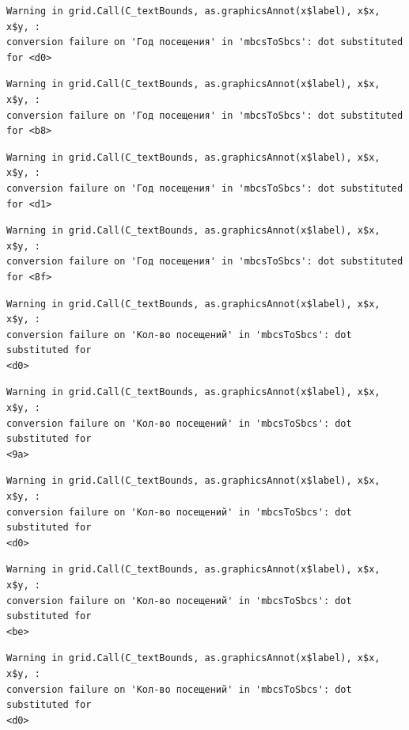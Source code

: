 \documentclass[
  letterpaper,
  DIV=11,
  numbers=noendperiod]{scrartcl}
\begin{document}
\begin{verbatim}
Warning in grid.Call(C_textBounds, as.graphicsAnnot(x$label), x$x, x$y, :
conversion failure on 'Год посещения' in 'mbcsToSbcs': dot substituted for <d0>
\end{verbatim}

\begin{verbatim}
Warning in grid.Call(C_textBounds, as.graphicsAnnot(x$label), x$x, x$y, :
conversion failure on 'Год посещения' in 'mbcsToSbcs': dot substituted for <b8>
\end{verbatim}

\begin{verbatim}
Warning in grid.Call(C_textBounds, as.graphicsAnnot(x$label), x$x, x$y, :
conversion failure on 'Год посещения' in 'mbcsToSbcs': dot substituted for <d1>
\end{verbatim}

\begin{verbatim}
Warning in grid.Call(C_textBounds, as.graphicsAnnot(x$label), x$x, x$y, :
conversion failure on 'Год посещения' in 'mbcsToSbcs': dot substituted for <8f>
\end{verbatim}

\begin{verbatim}
Warning in grid.Call(C_textBounds, as.graphicsAnnot(x$label), x$x, x$y, :
conversion failure on 'Кол-во посещений' in 'mbcsToSbcs': dot substituted for
<d0>
\end{verbatim}

\begin{verbatim}
Warning in grid.Call(C_textBounds, as.graphicsAnnot(x$label), x$x, x$y, :
conversion failure on 'Кол-во посещений' in 'mbcsToSbcs': dot substituted for
<9a>
\end{verbatim}

\begin{verbatim}
Warning in grid.Call(C_textBounds, as.graphicsAnnot(x$label), x$x, x$y, :
conversion failure on 'Кол-во посещений' in 'mbcsToSbcs': dot substituted for
<d0>
\end{verbatim}

\begin{verbatim}
Warning in grid.Call(C_textBounds, as.graphicsAnnot(x$label), x$x, x$y, :
conversion failure on 'Кол-во посещений' in 'mbcsToSbcs': dot substituted for
<be>
\end{verbatim}

\begin{verbatim}
Warning in grid.Call(C_textBounds, as.graphicsAnnot(x$label), x$x, x$y, :
conversion failure on 'Кол-во посещений' in 'mbcsToSbcs': dot substituted for
<d0>
\end{verbatim}
\end{document}
